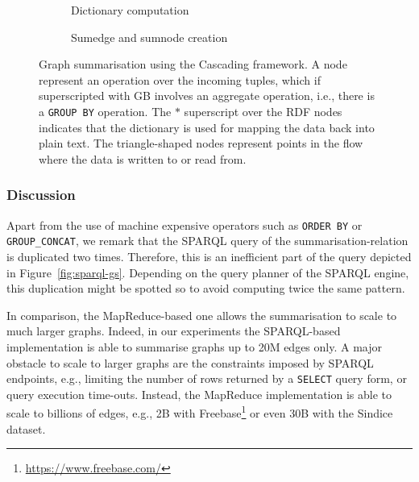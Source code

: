 \begin{figure}
	\centering
	\begin{subfigure}{\textwidth}
		\centering
		\resizebox{.6\textwidth}{!}{
			
		}
		\caption{Dictionary computation}
		\label{fig:dict-cascading}
	\end{subfigure}
	\qquad
	\begin{subfigure}{\textwidth}
		\centering
		\resizebox{\textwidth}{!}{
			
		}
		\caption{Sumedge and sumnode creation}
		\label{fig:va-cascading}
	\end{subfigure}
	\caption[Graph summarisation using the Cascading framework]{Graph summarisation using the Cascading framework. A node represent an operation over the incoming tuples, which if superscripted with GB involves an aggregate operation, i.e., there is a \texttt{GROUP BY} operation. The $*$ superscript over the RDF nodes indicates that the dictionary is used for mapping the data back into plain text. The triangle-shaped nodes represent points in the flow where the data is written to or read from.}
	\label{fig:summary-cascading}
\end{figure}

\subsubsection{Discussion}

Apart from the use of machine expensive operators such as \texttt{ORDER BY} or \texttt{GROUP\_CONCAT}, we remark that the SPARQL query of the \gls{summarisation-relation} is duplicated two times. Therefore, this is an inefficient part of the query depicted in Figure~\ref{fig:sparql-gs}. Depending on the query planner of the SPARQL engine, this duplication might be spotted so to avoid computing twice the same pattern.

In comparison, the MapReduce-based one allows the summarisation to scale to much larger graphs. Indeed, in our experiments the SPARQL-based implementation is able to summarise graphs up to 20M edges only. A major obstacle to scale to larger graphs are the constraints imposed by SPARQL endpoints, e.g., limiting the number of rows returned by a \texttt{SELECT} query form, or query execution time-outs. Instead, the MapReduce implementation is able to scale to billions of edges, e.g., 2B with Freebase\footnote{\url{https://www.freebase.com/}} or even 30B with the Sindice dataset.

